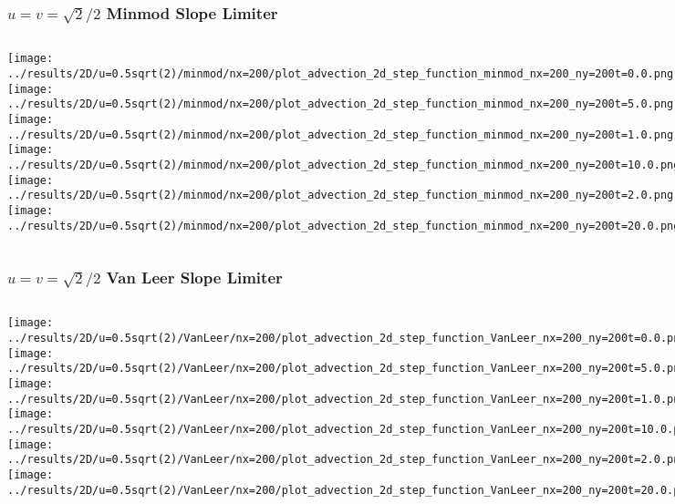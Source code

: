 \begin{frame}
	\frametitle{$u = v = \sqrt{2}/2$ Minmod Slope Limiter}
	\begin{columns}
		\centering
		\texttt{[image: ../results/2D/u=0.5sqrt(2)/minmod/nx=200/plot\_advection\_2d\_step\_function\_minmod\_nx=200\_ny=200t=0.0.png]}\\
		\texttt{[image: ../results/2D/u=0.5sqrt(2)/minmod/nx=200/plot\_advection\_2d\_step\_function\_minmod\_nx=200\_ny=200t=5.0.png]}
		\centering
		\texttt{[image: ../results/2D/u=0.5sqrt(2)/minmod/nx=200/plot\_advection\_2d\_step\_function\_minmod\_nx=200\_ny=200t=1.0.png]}\\
		\texttt{[image: ../results/2D/u=0.5sqrt(2)/minmod/nx=200/plot\_advection\_2d\_step\_function\_minmod\_nx=200\_ny=200t=10.0.png]}
		\centering
		\texttt{[image: ../results/2D/u=0.5sqrt(2)/minmod/nx=200/plot\_advection\_2d\_step\_function\_minmod\_nx=200\_ny=200t=2.0.png]}\\
		\texttt{[image: ../results/2D/u=0.5sqrt(2)/minmod/nx=200/plot\_advection\_2d\_step\_function\_minmod\_nx=200\_ny=200t=20.0.png]}
	\end{columns}
\end{frame}




\begin{frame}
	\frametitle{$u = v = \sqrt{2}/2$ Van Leer Slope Limiter}
	\begin{columns}
		\column{.33\textwidth}
		\centering
		\texttt{[image: ../results/2D/u=0.5sqrt(2)/VanLeer/nx=200/plot\_advection\_2d\_step\_function\_VanLeer\_nx=200\_ny=200t=0.0.png]}\\
		\texttt{[image: ../results/2D/u=0.5sqrt(2)/VanLeer/nx=200/plot\_advection\_2d\_step\_function\_VanLeer\_nx=200\_ny=200t=5.0.png]}
		\column{.33\textwidth}
		\centering
		\texttt{[image: ../results/2D/u=0.5sqrt(2)/VanLeer/nx=200/plot\_advection\_2d\_step\_function\_VanLeer\_nx=200\_ny=200t=1.0.png]}\\
		\texttt{[image: ../results/2D/u=0.5sqrt(2)/VanLeer/nx=200/plot\_advection\_2d\_step\_function\_VanLeer\_nx=200\_ny=200t=10.0.png]}
		\column{.33\textwidth}
		\centering
		\texttt{[image: ../results/2D/u=0.5sqrt(2)/VanLeer/nx=200/plot\_advection\_2d\_step\_function\_VanLeer\_nx=200\_ny=200t=2.0.png]}\\
		\texttt{[image: ../results/2D/u=0.5sqrt(2)/VanLeer/nx=200/plot\_advection\_2d\_step\_function\_VanLeer\_nx=200\_ny=200t=20.0.png]}
	\end{columns}
\end{frame}


